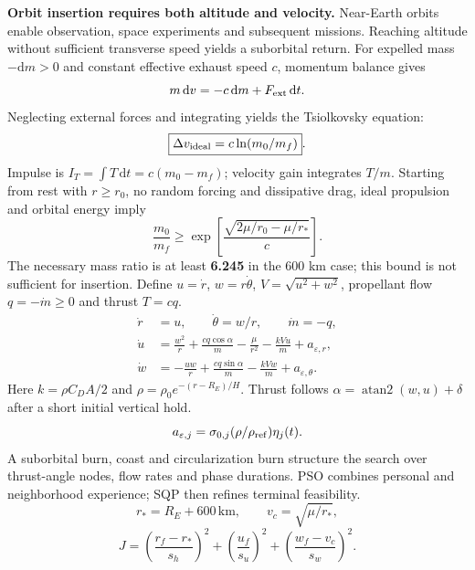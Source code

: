 \documentclass[10pt]{article}
\begin{document}
\fontsize{8.7}{10.3}\selectfont
{}
\columnstart
{}
\textbf{Orbit insertion requires both altitude and velocity.} Near-Earth orbits enable observation, space experiments and subsequent missions. Reaching altitude without sufficient transverse speed yields a suborbital return.
For expelled mass $-\mathrm dm>0$ and constant effective exhaust speed $c$, momentum balance gives
\[
 m\,\mathrm dv=-c\,\mathrm dm+F_{\rm ext}\,\mathrm dt.
\]
Neglecting external forces and integrating yields the Tsiolkovsky equation:
\[
 \boxed{\Delta v_{\rm ideal}=c\ln(m_0/m_f)}.
\]
Impulse is $I_T=\int T\,\mathrm dt=c(m_0-m_f)$; velocity gain integrates $T/m$. Starting from rest with $r\ge r_0$, no random forcing and dissipative drag, ideal propulsion and orbital energy imply
\[
 \frac{m_0}{m_f}\ge\exp\!\left[\frac{\sqrt{2\mu/r_0-\mu/r_*}}{c}\right].
\]
The necessary mass ratio is at least \textbf{6.245} in the 600 km case; this bound is not sufficient for insertion.
Define $u=\dot r$, $w=r\dot\theta$, $V=\sqrt{u^2+w^2}$, propellant flow $q=-\dot m\ge0$ and thrust $T=cq$.
\[
\begin{aligned}
 \dot r&=u,\qquad \dot\theta=w/r,\qquad \dot m=-q,\\
 \dot u&=\frac{w^2}{r}+\frac{cq\cos\alpha}{m}-\frac{\mu}{r^2}
 -\frac{kVu}{m}+a_{\varepsilon,r},\\
 \dot w&=-\frac{uw}{r}+\frac{cq\sin\alpha}{m}
 -\frac{kVw}{m}+a_{\varepsilon,\theta}.
\end{aligned}
\]
Here $k=\rho C_DA/2$ and $\rho=\rho_0e^{-(r-R_E)/H}$. Thrust follows $\alpha=\operatorname{atan2}(w,u)+\delta$ after a short initial vertical hold.
\[
 a_{\varepsilon,j}=\sigma_{0,j}(\rho/\rho_{\rm ref})\eta_j(t).
\]
\columnend\colsep
\columnstart
{}
A suborbital burn, coast and circularization burn structure the search over thrust-angle nodes, flow rates and phase durations. PSO combines personal and neighborhood experience; SQP then refines terminal feasibility.
\[
 r_*=R_E+600\,\mathrm{km},\qquad v_c=\sqrt{\mu/r_*},
\]
\[
 J=\left(\frac{r_f-r_*}{s_h}\right)^2+
 \left(\frac{u_f}{s_u}\right)^2+
 \left(\frac{w_f-v_c}{s_w}\right)^2.
\]
\end{document}
